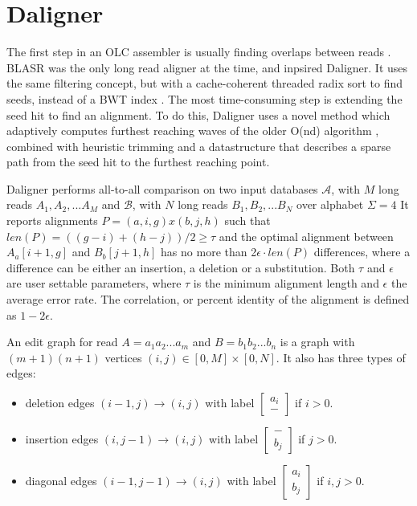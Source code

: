 \documentclass[../main/thesis.tex]{subfiles}
\begin{document}
\section{Daligner}
The first step in an \ac{OLC} assembler is usually finding overlaps between reads \cite{OLC}.
BLASR \cite{BLASR} was the only long read aligner at the time, and inpsired Daligner.
It uses the same filtering concept, but with a cache-coherent threaded radix sort to find seeds, instead of a BWT index \cite{BWT}.
The most time-consuming step is extending the seed hit to find an alignment.
To do this, Daligner uses a novel method which adaptively computes furthest reaching waves of the older O(nd) algorithm \cite{O_ND}, combined with heuristic trimming and a datastructure that describes a sparse path from the seed hit to the furthest reaching point.

Daligner performs all-to-all comparison on two input databases $\mathcal{A}$, with $M$ long reads $A_1, A_2,...A_M$ and $\mathcal{B}$, with $N$ long reads $B_1, B_2,...B_N$ over alphabet $\Sigma = 4$
It reports alignments $P = (a,i,g)x(b,j,h)$ such that $len(P) = ((g-i)+(h-j))/2 \ge \tau$ and the optimal alignment between $A_a[i+1,g]$ and $B_b[j+1,h]$ has no more than 2$\epsilon \cdot len(P)$ differences, where a difference can be either an insertion, a deletion or a substitution.
Both $\tau$ and $\epsilon$ are user settable parameters, where $\tau$ is the minimum alignment length and $\epsilon$ the average error rate.
The correlation, or percent identity of the alignment is defined as $1-2\epsilon$.

An edit graph for read $A=a_1a_2...a_m$ and $B=b_1b_2...b_n$ is a graph with $(m+1)(n+1)$ vertices $(i,j) \in [0,M]\times[0,N]$.
It also has three types of edges:
\begin{itemize}
\item deletion edges $(i-1,j) \rightarrow (i,j)$ with label
{\small$\begin{bmatrix}
a_i \\ -
\end{bmatrix}$} if $i > 0$.
\item insertion edges $(i,j-1) \rightarrow (i,j)$ with label 
{\small$\begin{bmatrix}
- \\ b_j
\end{bmatrix}$} if $j > 0$.
\item diagonal edges $(i-1,j-1) \rightarrow (i,j)$ with label
{\small$\begin{bmatrix}
a_i \\ b_j
\end{bmatrix}$} if $i,j > 0$.
\end{itemize}
\end{document}

